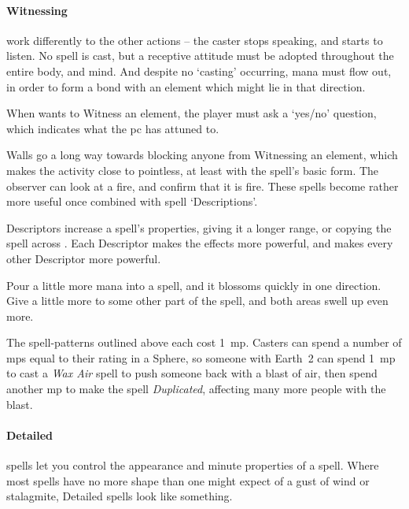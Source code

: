 \begin{multicols}{2}
\paragraph{Witnessing}
work differently to the other actions -- the caster stops speaking, and starts to listen.
No spell is cast, but a receptive attitude must be adopted throughout the entire body, and mind.
And despite no `casting' occurring, mana must flow out, in order to form a bond with an element which might lie in that direction.

When  wants to Witness an element, the player must ask a `yes/no' question, which indicates what the \gls{pc} has attuned to.

Walls go a long way towards blocking anyone from Witnessing an element, which makes the activity close to pointless, at least with the spell's basic form.
The observer can look at a fire, and confirm that it is fire.
These spells become rather more useful once combined with spell `Descriptions'.


Descriptors increase a spell's properties, giving it a longer range, or copying the spell across .
Each Descriptor makes the effects more powerful, and makes every other Descriptor more powerful.

Pour a little more mana into a spell, and it blossoms quickly in one direction.
Give a little more to some other part of the spell, and both areas swell up even more.

The spell-patterns outlined above each cost 1~\gls{mp}.
Casters can spend a number of \glspl{mp} equal to their rating in a Sphere, so someone with Earth~2 can spend 1~\gls{mp} to cast a \textit{Wax Air} spell to push someone back with a blast of air, then spend another \gls{mp} to make the spell \textit{Duplicated}, affecting many more people with the blast.

\paragraph{Detailed}
spells let you control the appearance and minute properties of a spell.
Where most spells have no more shape than one might expect of a gust of wind or stalagmite, Detailed spells look like something.


\end{multicols}
